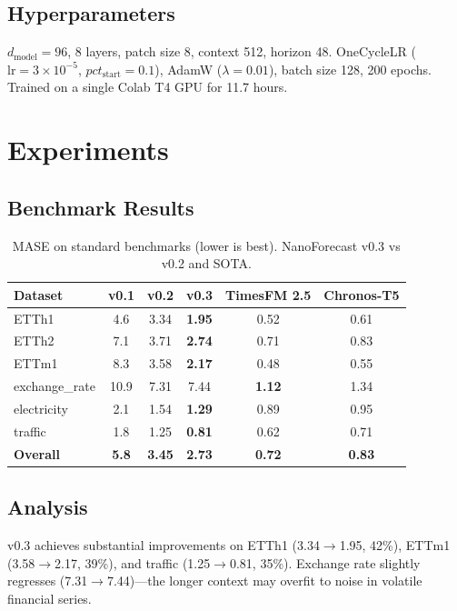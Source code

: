 \documentclass[11pt]{article}
\begin{document}
\subsection{Hyperparameters}
$d_{\text{model}}=96$, 8 layers, patch size 8, context 512, horizon 48. OneCycleLR ($\text{lr}=3 \times 10^{-5}$, $pct_{\text{start}}=0.1$), AdamW ($\lambda=0.01$), batch size 128, 200 epochs. Trained on a single Colab T4 GPU for 11.7 hours.

\section{Experiments}

\subsection{Benchmark Results}

\begin{table}[h]
\centering
\caption{MASE on standard benchmarks (lower is best). NanoForecast v0.3 vs v0.2 and SOTA.}
\label{tab:benchmarks}
\begin{tabular}{lccccc}
\toprule
Dataset & v0.1 & v0.2 & \textbf{v0.3} & TimesFM 2.5 & Chronos-T5 \\
\midrule
ETTh1 & 4.6 & 3.34 & \textbf{1.95} & 0.52 & 0.61 \\
ETTh2 & 7.1 & 3.71 & \textbf{2.74} & 0.71 & 0.83 \\
ETTm1 & 8.3 & 3.58 & \textbf{2.17} & 0.48 & 0.55 \\
exchange\_rate & 10.9 & 7.31 & 7.44 & \textbf{1.12} & 1.34 \\
electricity & 2.1 & 1.54 & \textbf{1.29} & 0.89 & 0.95 \\
traffic & 1.8 & 1.25 & \textbf{0.81} & 0.62 & 0.71 \\
\midrule
\textbf{Overall} & \textbf{5.8} & \textbf{3.45} & \textbf{2.73} & \textbf{0.72} & \textbf{0.83} \\
\bottomrule
\end{tabular}
\end{table}

\subsection{Analysis}
v0.3 achieves substantial improvements on ETTh1 (3.34$\to$1.95, 42\%), ETTm1 (3.58$\to$2.17, 39\%), and traffic (1.25$\to$0.81, 35\%). Exchange rate slightly regresses (7.31$\to$7.44)---the longer context may overfit to noise in volatile financial series.
\end{document}
